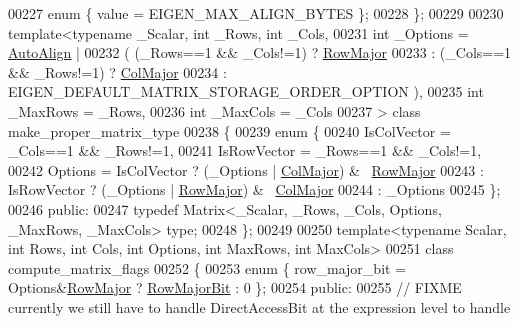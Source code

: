 \begin{DoxyCode}
{00227   \textcolor{keyword}{enum} \{ value = EIGEN\_MAX\_ALIGN\_BYTES \};
00228 \};
00229 
00230 \textcolor{keyword}{template}<\textcolor{keyword}{typename} \_Scalar, \textcolor{keywordtype}{int} \_Rows, \textcolor{keywordtype}{int} \_Cols,
00231          \textcolor{keywordtype}{int} \_Options = \hyperlink{group__enums_ggaacded1a18ae58b0f554751f6cdf9eb13a28d63c0dd8560827162decfd898804f4}{AutoAlign} |
00232                           ( (\_Rows==1 && \_Cols!=1) ? \hyperlink{group__enums_ggaacded1a18ae58b0f554751f6cdf9eb13acfcde9cd8677c5f7caf6bd603666aae3}{RowMajor}
00233                           : (\_Cols==1 && \_Rows!=1) ? \hyperlink{group__enums_ggaacded1a18ae58b0f554751f6cdf9eb13a0cbd4bdd0abcfc0224c5fcb5e4f6669a}{ColMajor}
00234                           : EIGEN\_DEFAULT\_MATRIX\_STORAGE\_ORDER\_OPTION ),
00235          \textcolor{keywordtype}{int} \_MaxRows = \_Rows,
00236          \textcolor{keywordtype}{int} \_MaxCols = \_Cols
00237 > \textcolor{keyword}{class} make\_proper\_matrix\_type
00238 \{
00239     \textcolor{keyword}{enum} \{
00240       IsColVector = \_Cols==1 && \_Rows!=1,
00241       IsRowVector = \_Rows==1 && \_Cols!=1,
00242       Options = IsColVector ? (\_Options | \hyperlink{group__enums_ggaacded1a18ae58b0f554751f6cdf9eb13a0cbd4bdd0abcfc0224c5fcb5e4f6669a}{ColMajor}) & ~\hyperlink{group__enums_ggaacded1a18ae58b0f554751f6cdf9eb13acfcde9cd8677c5f7caf6bd603666aae3}{RowMajor}
00243               : IsRowVector ? (\_Options | \hyperlink{group__enums_ggaacded1a18ae58b0f554751f6cdf9eb13acfcde9cd8677c5f7caf6bd603666aae3}{RowMajor}) & ~\hyperlink{group__enums_ggaacded1a18ae58b0f554751f6cdf9eb13a0cbd4bdd0abcfc0224c5fcb5e4f6669a}{ColMajor}
00244               : \_Options
00245     \};
00246   \textcolor{keyword}{public}:
00247     \textcolor{keyword}{typedef} Matrix<\_Scalar, \_Rows, \_Cols, Options, \_MaxRows, \_MaxCols> type;
00248 \};
00249 
00250 \textcolor{keyword}{template}<\textcolor{keyword}{typename} Scalar, \textcolor{keywordtype}{int} Rows, \textcolor{keywordtype}{int} Cols, \textcolor{keywordtype}{int} Options, \textcolor{keywordtype}{int} MaxRows, \textcolor{keywordtype}{int} MaxCols>
00251 \textcolor{keyword}{class }compute\_matrix\_flags
00252 \{
00253     \textcolor{keyword}{enum} \{ row\_major\_bit = Options&\hyperlink{group__enums_ggaacded1a18ae58b0f554751f6cdf9eb13acfcde9cd8677c5f7caf6bd603666aae3}{RowMajor} ? \hyperlink{group__flags_gae4f56c2a60bbe4bd2e44c5b19cbe8762}{RowMajorBit} : 0 \};
00254   \textcolor{keyword}{public}:
00255     \textcolor{comment}{// FIXME currently we still have to handle DirectAccessBit at the expression level to handle
}}
\end{DoxyCode}
